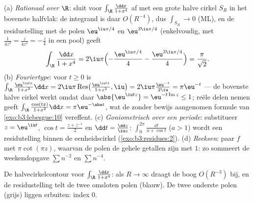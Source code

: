 \begin{example}
\label{ex:b3:residues:integrals}
(a) \emph{Rationaal over $\R$}: sluit voor $\int_\R\frac{\dd x}{1
+ x^4}$ af met een grote halve cirkel $S_R$ in het bovenste
halfvlak: de integrand is daar $O(R^{-4})$, dus $\int_{S_R} \to
0$ (ML), en de residustelling met de polen $\eu^{\iu\pi/4}$ en
$\eu^{3\iu\pi/4}$ (enkelvoudig, met  $\frac1{4z^3} =
\frac{z}{4z^4} = -\frac z4$ in een pool) geeft
\[
\int_\R\frac{\dd x}{1 + x^4}
= 2\iu\pi\Bigl(-\frac{\eu^{\iu\pi/4}}4 -
\frac{\eu^{3\iu\pi/4}}4\Bigr)
= \frac{\pi}{\sqrt2} .
\]
(b) \emph{Fouriertype}: voor $t \geq 0$ is
$\int_\R\frac{\eu^{\iu tx}}{1 + x^2}\dd x =
2\iu\pi\operatorname{Res}\bigl(\tfrac{\eu^{\iu tz}}{1+z^2},
\iu\bigr) = 2\iu\pi\frac{\eu^{-t}}{2\iu} = \pi\eu^{-t}$ --- de
bovenste halve cirkel werkt omdat daar $\abs{\eu^{\iu tz}} =
\eu^{-t\operatorname{Im}z} \leq 1$; reële delen nemen geeft
$\int_\R\frac{\cos(tx)}{1+x^2}\dd x = \pi\eu^{-\abs t}$, wat de
zonder bewijs aangenomen formule van \cref{exo:b3:lebesgue:10}
vereffent.
(c) \emph{Goniometrisch over een periode}: substitueer $z =
\eu^{\iu t}$, $\cos t = \frac{z + z^{-1}}2$ en $\dd t = \frac{\dd
z}{\iu z}$: $\int_0^{2\pi}\frac{\dd t}{a + \cos t}$ ($a > 1$)
wordt een residutelling binnen de eenheidscirkel
(\cref{exo:b3:residues:2}).
(d) \emph{Reeksen}: paar $f$ met $\pi\cot(\pi z)$, waarvan de
polen de gehele getallen zijn met  $1$: zo sommeert de
weekendopgave $\sum n^{-2}$ en $\sum n^{-4}$.
\end{example}

\begin{omfigure}

{\small De halvecirkelcontour voor $\int_\R\frac{\dd x}{1 +
x^4}$: als $R \to \infty$ draagt de boog $O(R^{-3})$ bij, en de
residustelling telt de twee omsloten polen (blauw). De twee
onderste polen (grijs) liggen erbuiten: index $0$.}
\end{omfigure}

